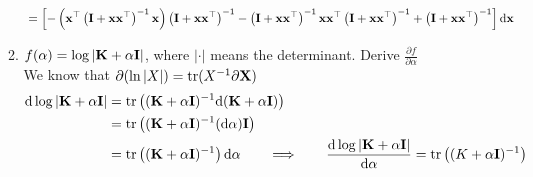 \documentclass[12pt, fullpage,letterpaper]{article}
\def\blackblue{\color{black!40!blue}}
\begin{document}
\begin{enumerate}
\begin{enumerate}
{\begin{align*}
	& =  \left[-\left({\bf x}^\top  \left({\bf I} + {\bf x}{\bf x}^\top\right)^{-1} {\bf x}\right)\left({\bf I} + {\bf x}{\bf x}^\top\right)^{-1}  -
	 \left({\bf I} + {\bf x}{\bf x}^\top\right)^{-1}  {\bf x}{\bf x}^\top \left({\bf I} + {\bf x}{\bf x}^\top\right)^{-1} 
	 + \left({\bf I} + {\bf x}{\bf x}^\top\right)^{-1}\right] {\rm d}{\bf x}
	\end{align*}
	}
	\item $f(\alpha) = \log |{\bf K} + \alpha {\bf I}|$, where $|\cdot|$ means the determinant. Derive $\frac{\partial f}{\partial \alpha}$\\
	{\blackblue \noindent
	We know that $\partial(\ln\left| X \right|) = {\rm tr}(X^{-1}\partial {\bf X})$
	\begin{align*}
	{\rm d} \log |{\bf K} + \alpha {\bf I} | & =  {\rm tr}\left(({\bf K} + \alpha {\bf I})^{-1}{\rm d} ({\bf K} + \alpha {\bf I})\right)\\
	& = {\rm tr}\left(({\bf K} + \alpha {\bf I})^{-1}({\rm d}\alpha) {\bf I}\right)\\
	 & = {\rm tr}\left(({\bf K} + \alpha {\bf I})^{-1}\right) {\rm d}\alpha\qquad \Longrightarrow \qquad \frac{{\rm d}  \log |{\bf K} + \alpha {\bf I} |}{{\rm d} \alpha} = {\rm tr}\left((K+\alpha{\bf I})^{-1}\right)
	\end{align*}
	}
	

\end{enumerate}
\end{enumerate}
\end{document}
